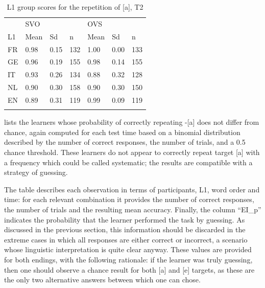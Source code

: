 \begin{table}
    \begin{tabularx}{\textwidth}{XXXXXXX} & \multicolumn{3}{X}{SVO} & \multicolumn{3}{X}{OVS}\\
    \lsptoprule
    L1 & Mean & Sd & n & Mean & Sd & n\\
    \midrule
    FR & 0.98 & 0.15 & 132 & 1.00 & 0.00 & 133\\
    GE & 0.96 & 0.19 & 155 & 0.98 & 0.14 & 155\\
    IT & 0.93 & 0.26 & 134 & 0.88 & 0.32 & 128\\
    NL & 0.90 & 0.30 & 158 & 0.90 & 0.30 & 150\\
    EN & 0.89 & 0.31 & 119 & 0.99 & 0.09 & 119\\
    \lspbottomrule
    \end{tabularx}
    \caption{L1 group scores for the repetition of [a], T2}
    \label{tab:04:8}
\end{table}

 lists the learners whose probability of correctly repeating -[a] does not differ from chance, again computed for each test time based on a binomial distribution described by the number of correct responses, the number of trials, and a 0.5 chance threshold. These learners do not appear to correctly repeat target [a] with a frequency which could be called systematic; the results are compatible with a strategy of guessing.

The table describes each observation in terms of participants, L1, word order and time: for each relevant combination it provides the number of correct responses, the number of trials and the resulting mean accuracy. Finally, the column “EI\_p” indicates the probability that the learner performed the task by guessing. As discussed in the previous section, this information should be discarded in the extreme cases in which all responses are either correct or incorrect, a scenario whose linguistic interpretation is quite clear anyway. These values are provided for both endings, with the following rationale: if the learner was truly guessing, then one should observe a chance result for both [a] and [e] targets, as these are the only two alternative answers between which one can chose.

